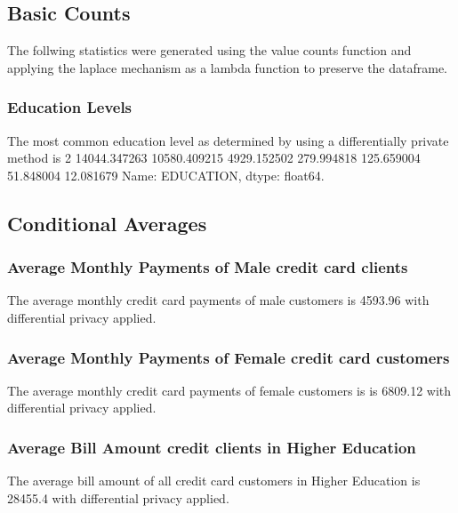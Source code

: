 \documentclass{article}%
\begin{document}
%
\subsection{Basic Counts}%
\label{subsec:BasicCounts}%
The follwing statistics were generated using the value counts function and applying the laplace mechanism as a lambda function to preserve the dataframe.%
\subsubsection{Education Levels}%
\label{ssubsec:EducationLevels}%
The most common education level as determined by using a differentially private method is 2    14044.347263    10580.409215     4929.152502      279.994818      125.659004       51.848004       12.081679\newline%
Name: EDUCATION, dtype: float64.

%
\subsection{Conditional Averages}%
\label{subsec:ConditionalAverages}%
\subsubsection{Average Monthly Payments of Male credit card clients}%
\label{ssubsec:AverageMonthlyPaymentsofMalecreditcardclients}%
The average monthly credit card payments of male customers is 4593.96 with differential privacy applied.

%
\subsubsection{Average Monthly Payments of Female credit card customers}%
\label{ssubsec:AverageMonthlyPaymentsofFemalecreditcardcustomers}%
The average monthly credit card payments of female customers is is 6809.12 with differential privacy applied.

%
\subsubsection{Average Bill Amount credit clients in Higher Education}%
\label{ssubsec:AverageBillAmountcreditclientsinHigherEducation}%
The average bill amount of all credit card customers in Higher Education is 28455.4 with differential privacy applied.
\end{document}
